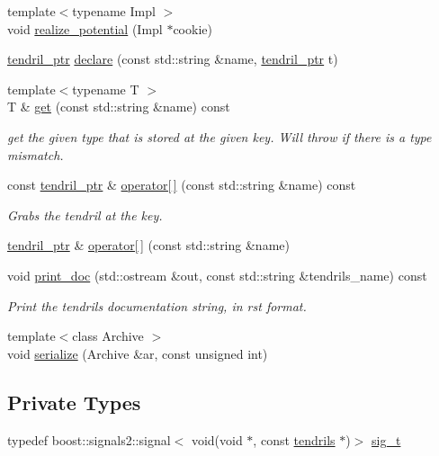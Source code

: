 \begin{DoxyCompactItemize}
\item 
{\footnotesize template$<$typename Impl $>$ }\\void \hyperlink{classecto_1_1tendrils_a1072755c7df91725bcabb7dc65db103b}{realize\+\_\+potential} (Impl $\ast$cookie)
\item 
\hyperlink{namespaceecto_a84fb5f6130275382e5cbeb5fdececa78}{tendril\+\_\+ptr} \hyperlink{classecto_1_1tendrils_aa32bcd230653775b655b63a415a349eb}{declare} (const std\+::string \&name, \hyperlink{namespaceecto_a84fb5f6130275382e5cbeb5fdececa78}{tendril\+\_\+ptr} t)
\item 
{\footnotesize template$<$typename T $>$ }\\T \& \hyperlink{classecto_1_1tendrils_a43aea6bf46edc5921a9768838b9fbe93}{get} (const std\+::string \&name) const 
\begin{DoxyCompactList}\small\item\em get the given type that is stored at the given key. Will throw if there is a type mismatch. \end{DoxyCompactList}\item 
const \hyperlink{namespaceecto_a84fb5f6130275382e5cbeb5fdececa78}{tendril\+\_\+ptr} \& \hyperlink{classecto_1_1tendrils_a2462fa379fff3d0f81afa8eb40d45624}{operator\mbox{[}$\,$\mbox{]}} (const std\+::string \&name) const 
\begin{DoxyCompactList}\small\item\em Grabs the tendril at the key. \end{DoxyCompactList}\item 
\hyperlink{namespaceecto_a84fb5f6130275382e5cbeb5fdececa78}{tendril\+\_\+ptr} \& \hyperlink{classecto_1_1tendrils_a774ab854c749359953b44ffdaa62456c}{operator\mbox{[}$\,$\mbox{]}} (const std\+::string \&name)
\item 
void \hyperlink{classecto_1_1tendrils_a3e29152c1c0979cf02219d0e02b8fb5e}{print\+\_\+doc} (std\+::ostream \&out, const std\+::string \&tendrils\+\_\+name) const 
\begin{DoxyCompactList}\small\item\em Print the tendrils documentation string, in rst format. \end{DoxyCompactList}\item 
{\footnotesize template$<$class Archive $>$ }\\void \hyperlink{classecto_1_1tendrils_aa9839d00f20cf2a3b87c0cbf19864a4f}{serialize} (Archive \&ar, const unsigned int)
\end{DoxyCompactItemize}
\subsection*{Private Types}
\begin{DoxyCompactItemize}
\item 
typedef boost\+::signals2\+::signal$<$ void(void $\ast$, const \hyperlink{classecto_1_1tendrils}{tendrils} $\ast$)$>$ \hyperlink{classecto_1_1tendrils_aca7990b4d8ccfbddfb4d5c805345ca23}{sig\+\_\+t}
\end{DoxyCompactItemize}
